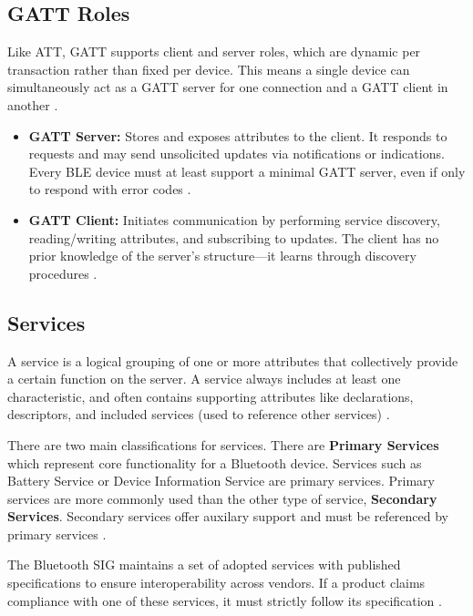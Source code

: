 \subsection{GATT Roles}

Like ATT, GATT supports client and server roles, which are dynamic per transaction rather than fixed per device. This means a single device can simultaneously act as a GATT server for one connection and a GATT client in another \cite{introtoble}.

\begin{itemize}
    \item \textbf{GATT Server:} Stores and exposes attributes to the client. It responds to requests and may send unsolicited updates via notifications or indications. Every BLE device must at least support a minimal GATT server, even if only to respond with error codes \cite{gettingstartedwble}.
    \item \textbf{GATT Client:} Initiates communication by performing service discovery, reading/writing attributes, and subscribing to updates. The client has no prior knowledge of the server’s structure—it learns through discovery procedures \cite{gettingstartedwble}.
\end{itemize}

\subsection{Services}

A service is a logical grouping of one or more attributes that collectively provide a certain function on the server. A service always includes at least one characteristic, and often contains supporting attributes like declarations, descriptors, and included services (used to reference other services) \cite{introtoble}.

There are two main classifications for services. There are \textbf{Primary Services} which represent core functionality for a Bluetooth device. Services such as Battery Service or Device Information Service are primary services. Primary services are more commonly used than the other type of service, \textbf{Secondary Services}. Secondary services offer auxilary support and must be referenced by primary services \cite{introtoble}.

The Bluetooth SIG maintains a set of adopted services with published specifications to ensure interoperability across vendors. If a product claims compliance with one of these services, it must strictly follow its specification \cite{introtoble}.

